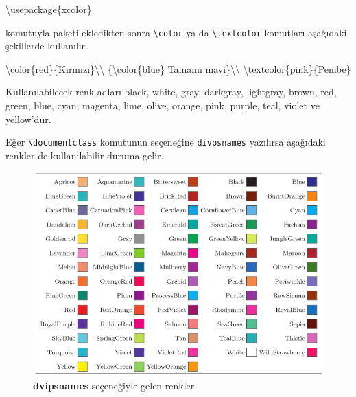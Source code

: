 \documentclass[
  10pt,
]{scrbook}
\newenvironment{Shaded}{\begin{snugshade}}{\end{snugshade}}
\newcommand{\BuiltInTok}[1]{#1}
\newcommand{\ExtensionTok}[1]{#1}
\newcommand{\FunctionTok}[1]{\textcolor[rgb]{0.00,0.00,0.00}{#1}}
\newcommand{\NormalTok}[1]{#1}
\theoremstyle{definition}
\theoremstyle{definition}
\theoremstyle{definition}
\theoremstyle{definition}
\theoremstyle{remark}
\begin{document}
\begin{Shaded}
\begin{Highlighting}[]
\BuiltInTok{\textbackslash{}usepackage}\NormalTok{\{}\ExtensionTok{xcolor}\NormalTok{\}}
\end{Highlighting}
\end{Shaded}

komutuyla paketi ekledikten sonra \texttt{\textbackslash{}color} ya da \texttt{\textbackslash{}textcolor} komutları aşağıdaki şekillerde kullanılır.

\begin{Shaded}
\begin{Highlighting}[]
\FunctionTok{\textbackslash{}color}\NormalTok{\{red\}\{Kırmızı\}}\FunctionTok{\textbackslash{}\textbackslash{}}
\NormalTok{\{}\FunctionTok{\textbackslash{}color}\NormalTok{\{blue\} Tamamı mavi\}}\FunctionTok{\textbackslash{}\textbackslash{}}
\FunctionTok{\textbackslash{}textcolor}\NormalTok{\{pink\}\{Pembe\}}
\end{Highlighting}
\end{Shaded}

Kullanılabilecek renk adları black, white, gray, darkgray, lightgray, brown, red, green, blue, cyan, magenta, lime, olive, orange, pink, purple, teal, violet ve yellow'dur.

Eğer \texttt{\textbackslash{}documentclass} komutunun seçeneğine \texttt{divpsnames} yazılırsa aşağıdaki renkler de kullanılabilir duruma gelir.

\begin{figure}
\centering
\includegraphics[width=1\textwidth,height=\textheight]{images/renkler.png}
\caption{\textbf{dvipsnames} seçeneğiyle gelen renkler}
\end{figure}
\end{document}

